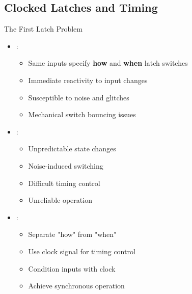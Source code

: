 \subsection{Clocked Latches and Timing}

\begin{frame}{The First Latch Problem}
\begin{itemize}
\item {}: 
\begin{itemize}
\item Same inputs specify \textbf{how} and \textbf{when} latch switches
\item Immediate reactivity to input changes
\item Susceptible to noise and glitches
\item Mechanical switch bouncing issues
\end{itemize}
\vspace{0.5cm}
\item {}:
\begin{itemize}
\item Unpredictable state changes
\item Noise-induced switching
\item Difficult timing control
\item Unreliable operation
\end{itemize}
\vspace{0.5cm}
\item {}:
\begin{itemize}
\item Separate "how" from "when"
\item Use clock signal for timing control
\item Condition inputs with clock
\item Achieve synchronous operation
\end{itemize}
\end{itemize}
\end{frame}
